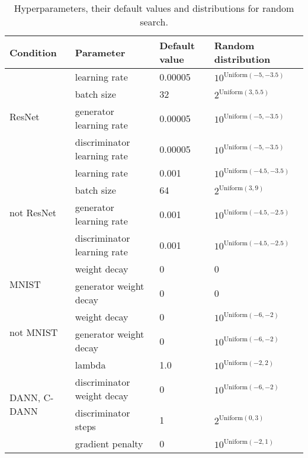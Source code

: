 \documentclass{article}
\begin{document}
\begin{table}[H]
    \caption{Hyperparameters, their default values and distributions for random search.} 
    \begin{center}
    { 
    \begin{tabular}{llll}
        \toprule
        \textbf{Condition} & \textbf{Parameter} & \textbf{Default value} & \textbf{Random distribution}\\
        \midrule
        \multirow{4}{*}{ResNet}       & learning rate & 0.00005 & $10^{\text{Uniform}(-5, -3.5)}$\\
                                      & batch size    & 32   & $2^{\text{Uniform}(3, 5.5)}$\\
                                      & generator learning rate & 0.00005 & $10^{\text{Uniform}(-5, -3.5)}$\\
                                      & discriminator learning rate & 0.00005 & $10^{\text{Uniform}(-5, -3.5)}$\\
        \midrule
        \multirow{4}{*}{not ResNet}   & learning rate & 0.001 & $10^{\text{Uniform}(-4.5, -3.5)}$\\
                                      & batch size    & 64   & $2^{\text{Uniform}(3, 9)}$\\
                                      & generator learning rate & 0.001 & $10^{\text{Uniform}(-4.5, -2.5)}$\\
                                      & discriminator learning rate & 0.001 & $10^{\text{Uniform}(-4.5, -2.5)}$\\
        \midrule
        \multirow{2}{*}{MNIST}        & weight decay & 0    & 0\\
                                      & generator weight decay & 0    & 0\\
        \midrule
        \multirow{2}{*}{not MNIST}    & weight decay & 0    & $10^{\text{Uniform}(-6, -2)}$\\
                                      & generator weight decay & 0    & $10^{\text{Uniform}(-6, -2)}$\\
        \midrule
        \multirow{5}{1.5cm}{DANN, C-DANN} & lambda                 & 1.0    & $10^{\text{Uniform}(-2, 2)}$\\
         & discriminator weight decay & 0    & $10^{\text{Uniform}(-6, -2)}$\\
         & discriminator steps        & 1    & $2^{\text{Uniform}(0, 3)}$\\
         & gradient penalty           & 0    & $10^{\text{Uniform}(-2, 1)}$\\

\end{tabular}}
\end{center}
\end{table}
\end{document}
